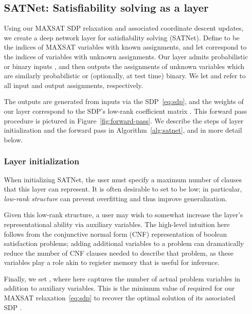 \documentclass{article}
\begin{document}
	\subsection{SATNet: Satisfiability solving as a layer}
	
	Using our MAXSAT SDP relaxation and associated coordinate descent updates, we create a deep network layer for satisfiability solving (SATNet).
	Define  to be the indices of MAXSAT variables with known assignments, and let  correspond to the indices of variables with unknown assignments.
	Our layer admits probabilistic or binary inputs , and then outputs the assignments of unknown variables  which are similarly probabilistic or (optionally, at test time) binary.
We let  and  refer to all input and output assignments, respectively.
	
	The outputs 
	  are generated from inputs 
	  via the SDP~\eqref{eq:sdp}, and the weights of our layer correspond to the SDP's low-rank coefficient matrix .
This forward pass procedure is pictured in Figure~\ref{fig:forward-pass}.
	We describe the steps of layer initialization and the forward pass in Algorithm~\ref{alg:satnet}, and in more detail below.
	
	\subsubsection{Layer initialization}
	\label{sec:aux}
	
	When initializing SATNet, the user must specify a maximum number of clauses  that this layer can represent.
	It is often desirable to set  to be low; in particular, \emph{low-rank structure} can prevent overfitting and thus improve generalization. 
	
Given this low-rank structure, a user may wish to somewhat increase the layer's representational ability via auxiliary variables.
The high-level intuition here follows from 
the conjunctive normal form (CNF) representation of boolean satisfaction problems; adding additional variables to a problem can dramatically reduce the number of CNF clauses needed to describe that problem, as these variables play a role akin to register memory that is useful for inference.
	
	Finally, we set , where here  captures the number of actual problem variables in addition to auxiliary variables. 
	This is the minimum value of  required for our MAXSAT relaxation~\eqref{eq:sdp} to recover the optimal solution of its associated SDP \cite{barvinok1995problems, pataki1998rank}.
	
\end{document}
